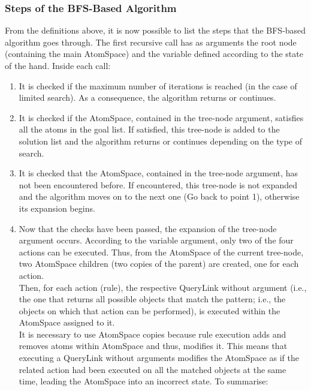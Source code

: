 \subsubsection{Steps of the BFS-Based Algorithm}\label{sec:step_search}

From the definitions above, it is now possible to list the steps that the BFS-based algorithm goes through. 
The first recursive call has as arguments the root node (containing the main AtomSpace) and the variable defined according to the state of the hand.
Inside each call:

\begin{enumerate}
	\item It is checked if the maximum number of iterations is reached (in the case of limited search). As a consequence, the algorithm returns or continues.
	
	\item It is checked if the AtomSpace, contained in the tree-node argument, satisfies all the atoms in the goal list. If satisfied, this tree-node is added to the solution list and the algorithm returns or continues depending on the type of search.
	
	\item It is checked that the AtomSpace, contained in the tree-node argument, has not been encountered before. If encountered, this tree-node is not expanded and the algorithm moves on to the next one (Go back to point 1), otherwise its expansion begins.
	
	\item Now that the checks have been passed, the expansion of the tree-node argument occurs. 
According to the variable argument, only two of the four actions can be executed.
Thus, from the AtomSpace of the current tree-node, two AtomSpace children (two copies of the parent) are created, one for each action. \\
Then, for each action (rule), the respective QueryLink without argument (i.e., the one that returns all possible objects that match the pattern; i.e., the objects on which that action can be performed), is executed within the AtomSpace assigned to it. \\
It is necessary to use AtomSpace copies because rule execution adds and removes atoms within AtomSpace and thus, modifies it. This means that executing a QueryLink without arguments modifies the AtomSpace as if the related action had been executed on all the matched objects at the same time, leading the AtomSpace into an incorrect state. 
To summarise: 


\end{enumerate}
